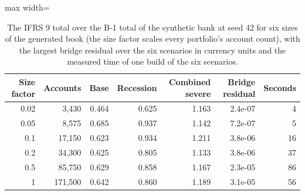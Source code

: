 \begin{table}[htbp]
\centering
\small
\caption{The IFRS 9 total over the B-1 total of the synthetic bank at seed 42 for six sizes of the generated book (the size factor scales every portfolio's account count), with the largest bridge residual over the six scenarios in currency units and the measured time of one build of the six scenarios.}
\label{tab:ladder}
\begin{adjustbox}{max width=\textwidth}
\begin{tabular}{rrrrrrr}
\toprule
Size factor & Accounts & Base & Recession & Combined severe & Bridge residual & Seconds \\
\midrule
0.02 & 3,430 & 0.464 & 0.625 & 1.163 & 2.4e-07 & 4 \\
0.05 & 8,575 & 0.685 & 0.937 & 1.142 & 7.2e-07 & 5 \\
0.1 & 17,150 & 0.623 & 0.934 & 1.211 & 3.8e-06 & 16 \\
0.2 & 34,300 & 0.625 & 0.805 & 1.133 & 3.8e-06 & 37 \\
0.5 & 85,750 & 0.629 & 0.858 & 1.167 & 2.3e-05 & 86 \\
1 & 171,500 & 0.642 & 0.860 & 1.189 & 3.1e-05 & 56 \\
\bottomrule
\end{tabular}
\end{adjustbox}
\end{table}
